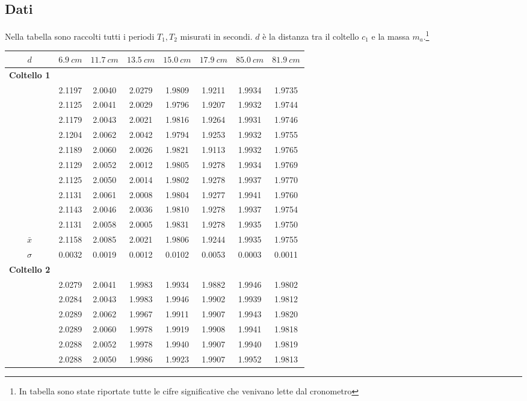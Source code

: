 \subsection{Dati}
Nella tabella sono raccolti tutti i periodi $T_1,T_2$ misurati in secondi. $d$ è la distanza tra il coltello $c_1$ e la massa $m_a$.\footnote{In tabella sono state riportate tutte le cifre significative che venivano lette dal cronometro}
\begin{center}
\begin{tabular}{*{8}{c}}
$d$& $6.9\ cm$ & $11.7\ cm$ & $13.5\ cm$  & $15.0\ cm$ & $17.9\ cm$ & $85.0\ cm$ & $81.9\ cm$ \\
\midrule
 \textbf{Coltello 1}&& & & & & \\
&2.1197 &2.0040&2.0279 &1.9809 & 1.9211 & 1.9934 & 1.9735\\
 &2.1125&2.0041 &2.0029&1.9796 & 1.9207 & 1.9932 & 1.9744 \\
 &2.1179&2.0043 &2.0021&1.9816 & 1.9264 & 1.9931 & 1.9746 \\
 &2.1204&2.0062 &2.0042&1.9794 & 1.9253 & 1.9932 & 1.9755 \\
 &2.1189&2.0060 &2.0026&1.9821 & 1.9113 & 1.9932 & 1.9765 \\
 &2.1129&2.0052&2.0012&1.9805 & 1.9278 & 1.9934 & 1.9769 \\
&2.1125 &2.0050&2.0014&1.9802 & 1.9278 & 1.9937 & 1.9770 \\
&2.1131 &2.0061&2.0008&1.9804 & 1.9277 & 1.9941 & 1.9760 \\
 &2.1143&2.0046&2.0036&1.9810 & 1.9278 & 1.9937 & 1.9754 \\
 &2.1131&2.0058&2.0005& 1.9831 & 1.9278 & 1.9935 & 1.9750 \\
 \midrule
$\bar{x}$& 2.1158 & 2.0085 & 2.0021 & 1.9806 & 1.9244 & 1.9935 & 1.9755\\
$\sigma$ & 0.0032 & 0.0019 & 0.0012 & 0.0102 & 0.0053 & 0.0003 & 0.0011\\
\midrule
\textbf{Coltello 2} && & & & & \\
&2.0279&2.0041&1.9983 &1.9934 & 1.9882 & 1.9946 & 1.9802 \\
&2.0284&2.0043&1.9983 &1.9946 & 1.9902 & 1.9939 & 1.9812 \\
&2.0289&2.0062&1.9967 &1.9911 & 1.9907 & 1.9943 & 1.9820 \\
&2.0289&2.0060&1.9978 &1.9919 & 1.9908 & 1.9941 & 1.9818 \\
&2.0288&2.0052&1.9978 &1.9940 & 1.9907 & 1.9940 & 1.9819 \\
&2.0288&2.0050&1.9986 &1.9923 & 1.9907 & 1.9952 & 1.9813 \\

\end{tabular}
\end{center}
